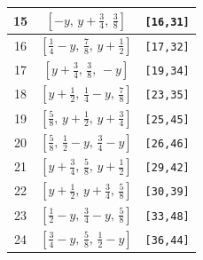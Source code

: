 \documentclass[fleqn,8pt]{jsarticle}
\begin{document}
\begin{longtable}{ccc}
15 & $\left[ - y,\, y + \frac{3}{4},\, \frac{3}{8} \right]$ & {\tt [16,31]} \\ \hline
16 & $\left[ \frac{1}{4} - y,\, \frac{7}{8},\, y + \frac{1}{2} \right]$ & {\tt [17,32]} \\ \hline
17 & $\left[ y + \frac{3}{4},\, \frac{3}{8},\, - y \right]$ & {\tt [19,34]} \\ \hline
18 & $\left[ y + \frac{1}{2},\, \frac{1}{4} - y,\, \frac{7}{8} \right]$ & {\tt [23,35]} \\ \hline
19 & $\left[ \frac{5}{8},\, y + \frac{1}{2},\, y + \frac{3}{4} \right]$ & {\tt [25,45]} \\ \hline
20 & $\left[ \frac{5}{8},\, \frac{1}{2} - y,\, \frac{3}{4} - y \right]$ & {\tt [26,46]} \\ \hline
21 & $\left[ y + \frac{3}{4},\, \frac{5}{8},\, y + \frac{1}{2} \right]$ & {\tt [29,42]} \\ \hline
22 & $\left[ y + \frac{1}{2},\, y + \frac{3}{4},\, \frac{5}{8} \right]$ & {\tt [30,39]} \\ \hline
23 & $\left[ \frac{1}{2} - y,\, \frac{3}{4} - y,\, \frac{5}{8} \right]$ & {\tt [33,48]} \\ \hline
24 & $\left[ \frac{3}{4} - y,\, \frac{5}{8},\, \frac{1}{2} - y \right]$ & {\tt [36,44]} \\
\end{longtable}
\renewcommand{\arraystretch}{1.2}
\end{document}
